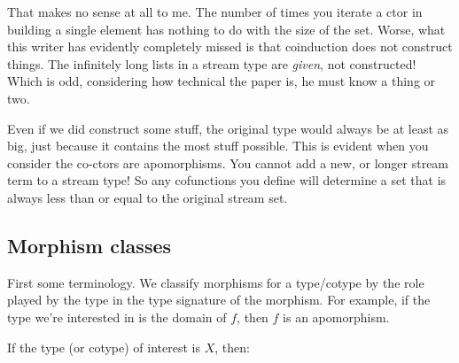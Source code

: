  That makes no sense at all to
me. The number of times you iterate a ctor in building a single
element has nothing to do with the size of the set. Worse, what this
writer has evidently completely missed is that coinduction does not
construct things. The infinitely long lists in a stream type are
\textit{given}, not constructed! Which is odd, considering how
technical the paper is, he must know a thing or two.

Even if we did construct some stuff, the original type would always be
at least as big, just because it contains the most stuff possible.
This is evident when you consider the co-ctors are apomorphisms. You
cannot add a new, or longer stream term to a stream type! So any
cofunctions you define will determine a set that is always less than
or equal to the original stream set.


\subsection{Morphism classes}\label{morph:classes}

First some terminology. We classify morphisms for a type/cotype by the
role played by the type in the type signature of the morphism. For
example, if the type we're interested in is the domain of \(f\), then
\(f\) is an apomorphism.

If the type (or cotype) of interest is \(X\), then:

